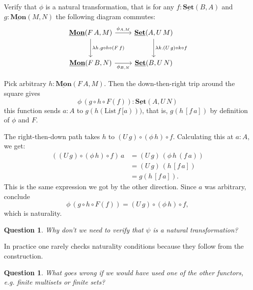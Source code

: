 \documentclass{article}
\newcommand{\Set}{\mathbf{Set}}
\newcommand{\cat}[1]{\underline{\mathbf{#1}}}
\newcommand{\homC}[3]{\cat{#1}(#2,#3)}
\newcommand{\List}{\mathrm{List}}
\newtheorem{question}[Exercise]{Question}
\begin{document}
\begin{Exercise}
  Verify that $\phi$ is a natural transformation, that is for any $f : \cat{Set}(B,A)$ and $g:\cat{Mon}(M,N)$ the following diagram commutes:
  \[\begin{tikzcd}[row sep = large]
    \cat{Mon}(F\,A,M) \arrow[r,"\phi_{A,M}"] \arrow[d,"\lambda h. g\circ h \circ (F\,f)"] & \cat{\Set}(A,U\,M)  \arrow[d,"\lambda k. (U\,g)\circ k \circ f"] \\
    \cat{Mon}(F\,B,N) \arrow[r,"\phi_{B,N}" below]  & \cat{\Set}(B,U\,N)  
\end{tikzcd}\]
\end{Exercise}
\begin{Answer}
  Pick arbitrary $h\colon\homC{Mon}{F\,A}{M}$. Then the down-then-right trip around the square gives
  \[ \phi\,(g\circ h\circ F(f)) \colon \homC{Set}{A}{U\,N} \]
  this function sends $a\colon A$ to $g(h(\List\,f\,[a)))$, that is, $g(h\,[f\,a])$ by definition of $\phi$ and $F$.
  
  The right-then-down path takes $h$ to $(U\,g)\circ (\phi\,h)\circ f$. Calculating this at $a:A$, we get:
  \begin{align*}
    ((U\,g)\circ (\phi\,h)\circ f)\,a 
      &= (U\,g)\,(\phi\,h\,(f\,a))\\
      &= (U\,g)\,(h\,[f\,a])\\
      &= g(h\,[f\,a]).
  \end{align*}
  This is the same expression we got by the other direction. Since $a$ was arbitrary, conclude
  \[ \phi\,(g\circ h\circ F(f)) = (U\,g)\circ (\phi\,h)\circ f,\]
  which is naturality.
\end{Answer}
\begin{question}
  Why don't we need to verify that $\psi$ is a natural transformation?
\end{question}
In practice one rarely checks naturality conditions because they follow from the construction. 

\begin{question}
  What goes wrong if we would have used one of the other functors, e.g. finite multisets or finite sets?
\end{question}
\end{document}

